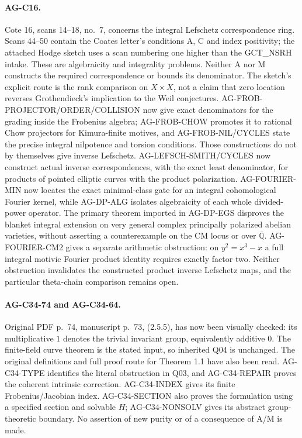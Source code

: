 \paragraph{AG-C16.} Cote 16, scans 14--18, no.~7, concerns the integral
Lefschetz correspondence ring. Scans 44--50 contain the Coates letter's
conditions A, C and index positivity; the attached Hodge sketch uses a scan
numbering one higher than the GCT\_NSRH intake. These are algebraicity and
integrality problems. Neither A nor M constructs the required
correspondence or bounds its denominator. The sketch's explicit route is
the rank comparison on $X\times X$, not a claim that zero location
reverses Grothendieck's implication to the Weil conjectures.
AG-FROB-PROJECTOR/ORDER/COLLISION now give exact denominators
for the grading inside the Frobenius algebra; AG-FROB-CHOW
promotes it to rational Chow projectors for Kimura-finite
motives, and AG-FROB-NIL/CYCLES state the precise integral
nilpotence and torsion conditions. Those constructions do not by themselves give inverse Lefschetz.
AG-LEFSCH-SMITH/CYCLES now construct actual inverse
correspondences, with the exact least denominator, for
products of pointed elliptic curves with the product
polarization.  AG-FOURIER-MIN now locates the exact
minimal-class gate for an integral cohomological Fourier
kernel, while AG-DP-ALG isolates algebraicity of each
whole divided-power operator.  The primary theorem
imported in AG-DP-EGS disproves the blanket integral
extension on very general complex principally polarized
abelian varieties, without asserting a counterexample on
the CM locus or over $\overline{\mathbb Q}$.
AG-FOURIER-CM2 gives a separate arithmetic obstruction:
on $y^2=x^3-x$ a full integral motivic Fourier product
identity requires exactly factor two.  Neither obstruction
invalidates the constructed product inverse Lefschetz maps,
and the particular theta-chain comparison remains open.

\paragraph{AG-C34-74 and AG-C34-64.} Original PDF p.~74, manuscript p.~73, (2.5.5),
has now been visually checked: its multiplicative $1$ denotes the trivial
invariant group, equivalently additive $0$. The finite-field curve theorem
is the stated input, so inherited Q04 is unchanged. The original
definitions and full proof route for Theorem 1.1 have also been read.
AG-C34-TYPE identifies the literal obstruction in Q03, and
AG-C34-REPAIR proves the coherent intrinsic correction. AG-C34-INDEX
gives its finite Frobenius/Jacobian index. AG-C34-SECTION also proves
the formulation using a specified section and solvable $H$;
AG-C34-NONSOLV gives its abstract group-theoretic boundary.
No assertion of new purity or
of a consequence of A/M is made.

